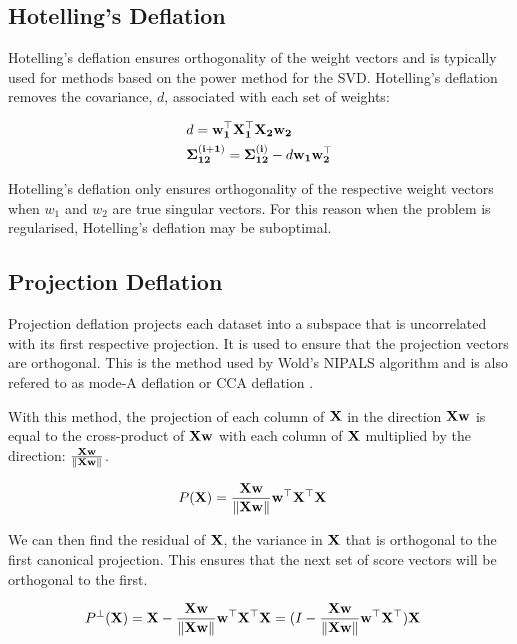 \subsection{Hotelling's Deflation}
Hotelling's deflation ensures orthogonality of the weight vectors and is typically used for methods based on the power method for the SVD. Hotelling's deflation removes the covariance, $d$, associated with each set of weights:

\begin{align}
    & d = \bold{w^{\top}_1X^{\top}_1X_2w_2}\\
    & \bold{\Sigma^{(i+1)}_{12}}= \bold{\Sigma^{(i)}_{12}} - d\bold{w_1w^{\top}_2}
\end{align}

Hotelling's deflation only ensures orthogonality of the respective weight vectors when $w_1$ and $w_2$ are true singular vectors. For this reason when the problem is regularised, Hotelling's deflation may be suboptimal.

\subsection{Projection Deflation}

Projection deflation projects each dataset into a subspace that is uncorrelated with its first respective projection. It is used to ensure that the projection vectors are orthogonal. This is the method used by Wold's NIPALS algorithm and is also refered to as mode-A deflation or CCA deflation \cite{mackey2009deflation}.

With this method, the projection of each column of $\bold{X}$ in the direction $\bold{Xw}$ is equal to the cross-product of $\bold{Xw}$ with each column of $\bold{X}$ multiplied by the direction: $\frac{\bold{Xw}}{\|\bold{Xw}\|}$.

\begin{align}
    & P(\bold{X})= \frac{\bold{Xw}}{\|\bold{Xw}\|}\bold{w^{\top}X^{\top}X}
\end{align}

We can then find the residual of $\bold{X}$, the variance in $\bold{X}$  that is orthogonal to the first canonical projection. This ensures that the next set of score vectors will be orthogonal to the first.

\begin{align}
    & P^\perp(\bold{X})= \bold{X} - \frac{\bold{Xw}}{\|\bold{Xw}\|}\bold{w^{\top}X^{\top}X} = (I - \frac{\bold{Xw}}{\|\bold{Xw}\|}\bold{w^{\top}X^{\top})X}
\end{align}



